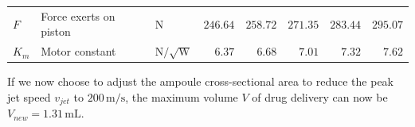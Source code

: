 \begin{landscape}
\begin{table}
\begin{tabular}{lllrrrrr}
                        $F$        & Force exerts on piston                 & $\mathrm{N}$         & $246.64$                      & $258.72$          & $271.35$          & $283.44$          & $295.07$          \\
                        $K_m$      & Motor constant                         & $\mathrm{N/\sqrt{W}}$ & $6.37$                        & $6.68$            & $7.01$            & $7.32$            & $7.62$           \\
                        \hline
                    \end{tabular}
                \end{table}
            \end{landscape}
            
            
        If we now choose to adjust the ampoule cross-sectional area to reduce the peak jet speed $v_{jet}$ to $200\,\mathrm{m/s}$, the maximum volume $V$ of drug delivery can now be $V_{new}=1.31\,\mathrm{mL}$. 
            
